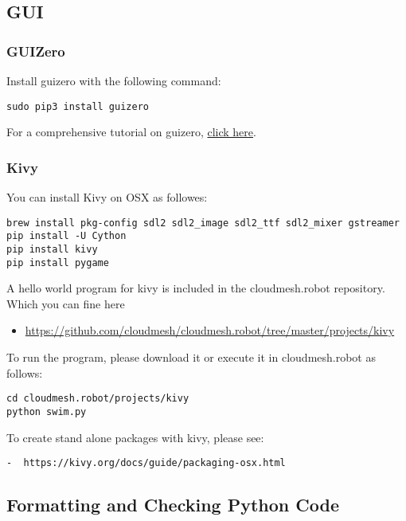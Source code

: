 \subsection{GUI}\label{gui}

\subsubsection{GUIZero}\label{guizero}

Install guizero with the following command:

\begin{verbatim}
sudo pip3 install guizero
\end{verbatim}

For a comprehensive tutorial on guizero,
\href{https://lawsie.github.io/guizero/howto/}{click here}.

\subsubsection{Kivy}\label{kivy}

You can install Kivy on OSX as followes:

\begin{verbatim}
brew install pkg-config sdl2 sdl2_image sdl2_ttf sdl2_mixer gstreamer
pip install -U Cython
pip install kivy
pip install pygame
\end{verbatim}

A hello world program for kivy is included in the cloudmesh.robot
repository. Which you can fine here

\begin{itemize}

\item
  \url{https://github.com/cloudmesh/cloudmesh.robot/tree/master/projects/kivy}
\end{itemize}

To run the program, please download it or execute it in cloudmesh.robot
as follows:

\begin{verbatim}
cd cloudmesh.robot/projects/kivy
python swim.py
\end{verbatim}

To create stand alone packages with kivy, please see:

\begin{verbatim}
-  https://kivy.org/docs/guide/packaging-osx.html
\end{verbatim}

\subsection{Formatting and Checking Python
Code}\label{formatting-and-checking-python-code}


